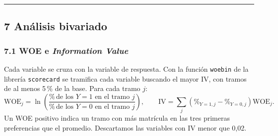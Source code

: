 \documentclass[11pt]{article}
\begin{document}
\medskip\hrule\medskip

\subsection*{7 \; Análisis bivariado}

\subsubsection*{7.1 \; WOE e \textit{Information Value}}

Cada variable se cruza con la variable de respuesta. Con la función
\texttt{woebin} de la librería \texttt{scorecard} se tramifica cada
variable buscando el mayor IV, con tramos de al menos 5\,\% de la base.
Para cada tramo $j$:
\[
\text{WOE}_j = \ln\!\left(\frac{\%\,\text{de los } Y=1 \text{ en el tramo } j}{\%\,\text{de los } Y=0 \text{ en el tramo } j}\right),
\qquad
\text{IV} = \sum_j \left(\%_{Y=1,j} - \%_{Y=0,j}\right)\text{WOE}_j .
\]
Un WOE positivo indica un tramo con más matrícula en las tres primeras
preferencias que el promedio. Descartamos las variables con IV menor que
0,02.
\end{document}
